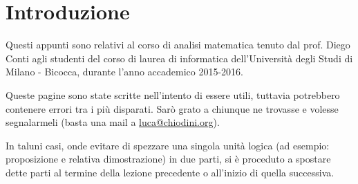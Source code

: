 
\chapter*{Introduzione}

Questi appunti sono relativi al corso di analisi matematica tenuto dal prof. Diego Conti agli studenti del corso di laurea di informatica dell'Università degli Studi di Milano - Bicocca, durante l'anno accademico 2015-2016. 

Queste pagine sono state scritte nell'intento di essere utili, tuttavia potrebbero contenere errori tra i più disparati. Sarò grato a chiunque ne trovasse e volesse segnalarmeli (basta una mail a \href{mailto:luca@chiodini.org}{luca@chiodini.org}).

In taluni casi, onde evitare di spezzare una singola unità logica (ad esempio: proposizione e relativa dimostrazione) in due parti, si è proceduto a spostare dette parti al termine della lezione precedente o all'inizio di quella successiva.